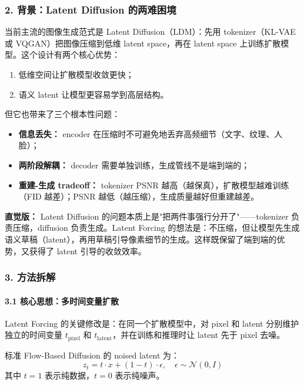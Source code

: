 \subsubsection{2. 背景：Latent Diffusion 的两难困境}

当前主流的图像生成范式是 Latent Diffusion（LDM）：先用 tokenizer（KL-VAE 或 VQGAN）把图像压缩到低维 latent space，再在 latent space 上训练扩散模型。这个设计有两个核心优势：
\begin{enumerate}[leftmargin=1.8em]
  \item 低维空间让扩散模型收敛更快；
  \item 语义 latent 让模型更容易学到高层结构。
\end{enumerate}

但它也带来了三个根本性问题：
\begin{itemize}[leftmargin=1.5em]
  \item \textbf{信息丢失：} encoder 在压缩时不可避免地丢弃高频细节（文字、纹理、人脸）；
  \item \textbf{两阶段解耦：} decoder 需要单独训练，生成管线不是端到端的；
  \item \textbf{重建-生成 tradeoff：} tokenizer PSNR 越高（越保真），扩散模型越难训练（FID 越差）；PSNR 越低（越压缩），生成质量越好但重建越差。
\end{itemize}

\begin{intubox}
\textbf{直觉版：} Latent Diffusion 的问题本质上是"把两件事强行分开了"——tokenizer 负责压缩，diffusion 负责生成。Latent Forcing 的想法是：不压缩，但让模型先生成语义草稿（latent），再用草稿引导像素细节的生成。这样既保留了端到端的优势，又获得了 latent 引导的收敛效率。
\end{intubox}

\subsubsection{3. 方法拆解}

\paragraph{3.1 核心思想：多时间变量扩散}

Latent Forcing 的关键修改是：在同一个扩散模型中，对 pixel 和 latent 分别维护独立的时间变量 $t_{\text{pixel}}$ 和 $t_{\text{latent}}$，并在训练和推理时让 latent 先于 pixel 去噪。

标准 Flow-Based Diffusion 的 noised latent 为：
$$z_t = t \cdot x + (1-t) \cdot \epsilon, \quad \epsilon \sim \mathcal{N}(0, I)$$
其中 $t=1$ 表示纯数据，$t=0$ 表示纯噪声。

